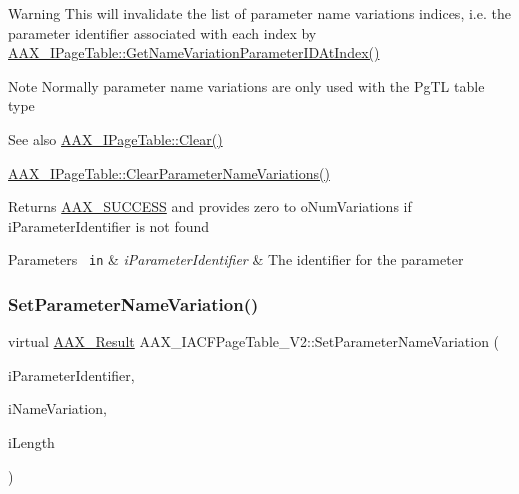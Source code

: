 \begin{DoxyWarning}{Warning}
This will invalidate the list of parameter name variations indices, i.\+e. the parameter identifier associated with each index by \mbox{\hyperlink{a01849_ac505024dd195c1965c54acac8f1f3016}{A\+A\+X\+\_\+\+I\+Page\+Table\+::\+Get\+Name\+Variation\+Parameter\+I\+D\+At\+Index()}}
\end{DoxyWarning}
\begin{DoxyNote}{Note}
Normally parameter name variations are only used with the {\ttfamily \textquotesingle{}Pg\+TL\textquotesingle{}} table type
\end{DoxyNote}
\begin{DoxySeeAlso}{See also}
\mbox{\hyperlink{a01849_a00a902ce17c43ae32947dba6088936d2}{A\+A\+X\+\_\+\+I\+Page\+Table\+::\+Clear()}} 

\mbox{\hyperlink{a01849_a6af3965eaf2baeadef9a44aa9c77ecbb}{A\+A\+X\+\_\+\+I\+Page\+Table\+::\+Clear\+Parameter\+Name\+Variations()}}
\end{DoxySeeAlso}
\begin{DoxyReturn}{Returns}
\mbox{\hyperlink{a00494_a5f8c7439f3a706c4f8315a9609811937aeddbd1bb67e3a66e6af54a4b4a7a57b3}{A\+A\+X\+\_\+\+S\+U\+C\+C\+E\+SS}} and provides zero to {\ttfamily o\+Num\+Variations} if {\ttfamily i\+Parameter\+Identifier} is not found
\end{DoxyReturn}

\begin{DoxyParams}[1]{Parameters}
\mbox{\texttt{ in}}  & {\em i\+Parameter\+Identifier} & The identifier for the parameter \\
\hline
\end{DoxyParams}
\mbox{\label{a01729_ac4e03c26b8423c49228d0011bf348e11}} 
\subsubsection{\texorpdfstring{SetParameterNameVariation()}{SetParameterNameVariation()}}
{\footnotesize\ttfamily virtual \mbox{\hyperlink{a00392_a4d8f69a697df7f70c3a8e9b8ee130d2f}{A\+A\+X\+\_\+\+Result}} A\+A\+X\+\_\+\+I\+A\+C\+F\+Page\+Table\+\_\+\+V2\+::\+Set\+Parameter\+Name\+Variation (\begin{DoxyParamCaption}\item[{\mbox{\hyperlink{a00392_ab4e01b971dac1b25632fd9f710dd8f77}{A\+A\+X\+\_\+\+C\+Page\+Table\+Param\+ID}}}]{i\+Parameter\+Identifier,  }\item[{const \mbox{\hyperlink{a01873}{A\+A\+X\+\_\+\+I\+String}} \&}]{i\+Name\+Variation,  }\item[{int32\+\_\+t}]{i\+Length }\end{DoxyParamCaption})\hspace{0.3cm}{\ttfamily [pure virtual]}}





